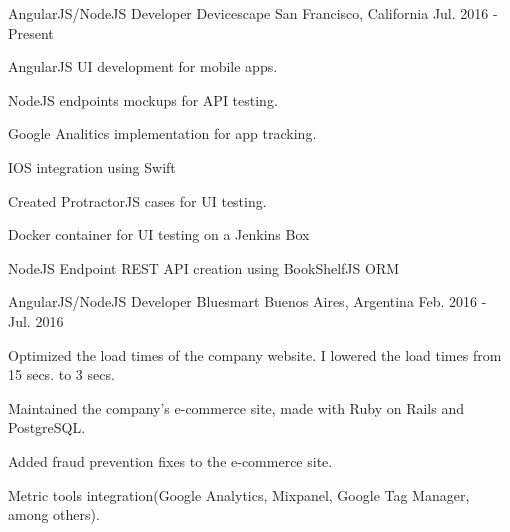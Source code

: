 

\begin{cventries}

  \cventry
      {AngularJS/NodeJS Developer} %
      {Devicescape} %
      {San Francisco, California} %
      {Jul. 2016 - Present} %
      {
        \begin{cvitems} %
          \item {AngularJS UI development for mobile apps.}
          \item {NodeJS endpoints mockups for API testing.}
          \item {Google Analitics implementation for app tracking.}
          \item {IOS integration using Swift}
          \item {Created ProtractorJS cases for UI testing.}
          \item {Docker container for UI testing on a Jenkins Box}
          \item {NodeJS Endpoint REST API creation using BookShelfJS ORM}
        \end{cvitems}
      }


  \cventry
    {AngularJS/NodeJS Developer} %
    {Bluesmart} %
    {Buenos Aires, Argentina} %
    {Feb. 2016 - Jul. 2016} %
    {
      \begin{cvitems} %
        \item {Optimized the load times of the company website. I lowered the load times from 15 secs. to 3 secs.}
        \item {Maintained the company's e-commerce site, made with Ruby on Rails and PostgreSQL.}
        \item {Added fraud prevention fixes to the e-commerce site.}
        \item {Metric tools integration(Google Analytics, Mixpanel, Google Tag Manager, among others).}
      \end{cvitems}
    }


\end{cventries}
